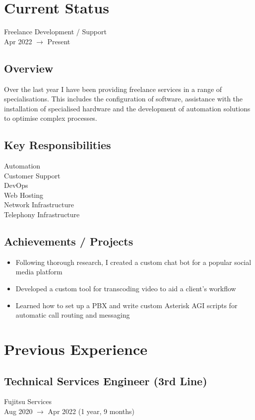 \documentclass{report}
\begin{document}
	\section*{Current Status}
		Freelance Development / Support\\
		Apr 2022 $\rightarrow$ Present
	
		\subsection*{Overview}
			Over the last year I have been providing freelance services in a range of specialisations.
			This includes the configuration of software, assistance with the installation of specialised
			hardware and the development of automation solutions to optimise complex processes.
		
		\subsection*{Key Responsibilities}
			\begin{multicols}{3}
				Automation\\
				Customer Support\\
				DevOps\\
				Web Hosting\\
				Network Infrastructure\\
				Telephony Infrastructure
			\end{multicols}
	
		\subsection*{Achievements / Projects}
			\begin{itemize}
				\setlength\itemsep{0pt}
				\item Following thorough research, I created a custom chat bot for a popular social media platform
				\item Developed a custom tool for transcoding video to aid a client's workflow
				\item Learned how to set up a PBX and write custom Asterisk AGI scripts for automatic call routing and messaging
			\end{itemize}

	\newpage
	
	\section*{Previous Experience}
		\subsection*{Technical Services Engineer (3rd Line)}
			Fujitsu Services\\
			Aug 2020 $\rightarrow$ Apr 2022 (1 year, 9 months)
\end{document}
